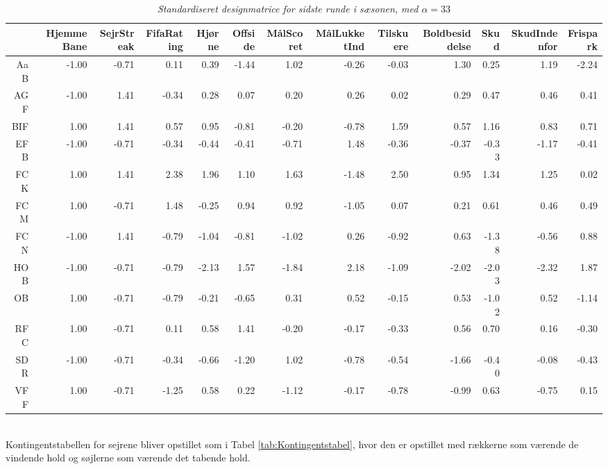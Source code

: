 \documentclass[11pt,a4paper]{article}
\begin{document}
\begin{table}[ht]
\centering
\begin{adjustbox}{max width=\textwidth}
\centering
\begin{tabular}{|r|rrrrrrrrrrrr|}
  \hline
 & HjemmeBane & SejrStreak & FifaRating & Hjørne & Offside & MålScoret & MålLukketInd & Tilskuere & Boldbesiddelse & Skud & SkudIndenfor & Frispark \\ 
  \hline
AaB & -1.00 & -0.71 & 0.11 & 0.39 & -1.44 & 1.02 & -0.26 & -0.03 & 1.30 & 0.25 & 1.19 & -2.24 \\ 
  AGF & -1.00 & 1.41 & -0.34 & 0.28 & 0.07 & 0.20 & 0.26 & 0.02 & 0.29 & 0.47 & 0.46 & 0.41 \\ 
  BIF & 1.00 & 1.41 & 0.57 & 0.95 & -0.81 & -0.20 & -0.78 & 1.59 & 0.57 & 1.16 & 0.83 & 0.71 \\ 
  EFB & -1.00 & -0.71 & -0.34 & -0.44 & -0.41 & -0.71 & 1.48 & -0.36 & -0.37 & -0.33 & -1.17 & -0.41 \\ 
  FCK & 1.00 & 1.41 & 2.38 & 1.96 & 1.10 & 1.63 & -1.48 & 2.50 & 0.95 & 1.34 & 1.25 & 0.02 \\ 
  FCM & 1.00 & -0.71 & 1.48 & -0.25 & 0.94 & 0.92 & -1.05 & 0.07 & 0.21 & 0.61 & 0.46 & 0.49 \\ 
  FCN & -1.00 & 1.41 & -0.79 & -1.04 & -0.81 & -1.02 & 0.26 & -0.92 & 0.63 & -1.38 & -0.56 & 0.88 \\ 
  HOB & -1.00 & -0.71 & -0.79 & -2.13 & 1.57 & -1.84 & 2.18 & -1.09 & -2.02 & -2.03 & -2.32 & 1.87 \\ 
  OB & 1.00 & -0.71 & -0.79 & -0.21 & -0.65 & 0.31 & 0.52 & -0.15 & 0.53 & -1.02 & 0.52 & -1.14 \\ 
  RFC & 1.00 & -0.71 & 0.11 & 0.58 & 1.41 & -0.20 & -0.17 & -0.33 & 0.56 & 0.70 & 0.16 & -0.30 \\ 
  SDR & -1.00 & -0.71 & -0.34 & -0.66 & -1.20 & 1.02 & -0.78 & -0.54 & -1.66 & -0.40 & -0.08 & -0.43 \\ 
  VFF & 1.00 & -0.71 & -1.25 & 0.58 & 0.22 & -1.12 & -0.17 & -0.78 & -0.99 & 0.63 & -0.75 & 0.15 \\ 
   \hline
\end{tabular}
\end{adjustbox}
\caption{\label{tab:Designmatrice}\textit{Standardiseret designmatrice for sidste runde i sæsonen, med $\alpha = 33$}}
\end{table}
\\Kontingentstabellen for sejrene bliver opstillet som i Tabel \ref{tab:Kontingentstabel}, hvor den er opstillet med rækkerne som værende de vindende hold og søjlerne som værende det tabende hold.
\end{document}
